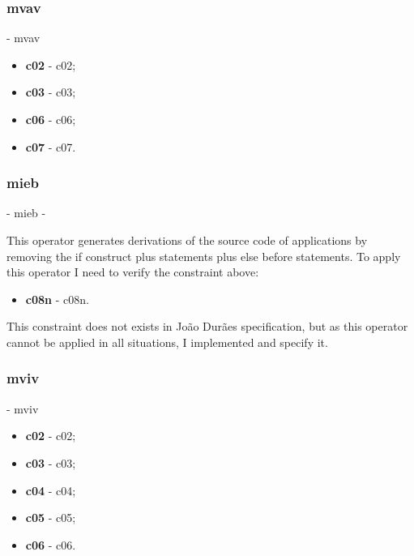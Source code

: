 	\hypertarget{mvav}{}
	\subsubsection{\textbf{\acs{mvav}}} - \Acl{mvav}

	\begin{itemize}
		\item \textbf{\acs{c02}} - \Acl{c02};
		\item \textbf{\acs{c03}} - \Acl{c03};
		\item \textbf{\acs{c06}} - \Acl{c06};
		\item \textbf{\acs{c07}} - \Acl{c07}.
	\end{itemize}

	\hypertarget{mieb}{}
	\subsubsection{\textbf{\acs{mieb}}} - \Acl{mieb} - 

	This operator generates derivations of the source code of applications by removing the if construct plus statements plus else before statements. To apply this operator I need to verify the constraint above:
	\begin{itemize}
		\item \textbf{\acs{c08n}} - \Acl{c08n}.
	\end{itemize}
	This constraint does not exists in João Durães specification, but as this operator cannot be applied in all situations, I implemented and specify it.

	\hypertarget{mviv}{}
	\subsubsection{\textbf{\acs{mviv}}} - \Acl{mviv}

	\begin{itemize}
		\item \textbf{\acs{c02}} - \Acl{c02};
		\item \textbf{\acs{c03}} - \Acl{c03};
		\item \textbf{\acs{c04}} - \Acl{c04};
		\item \textbf{\acs{c05}} - \Acl{c05};
		\item \textbf{\acs{c06}} - \Acl{c06}.
	\end{itemize}


